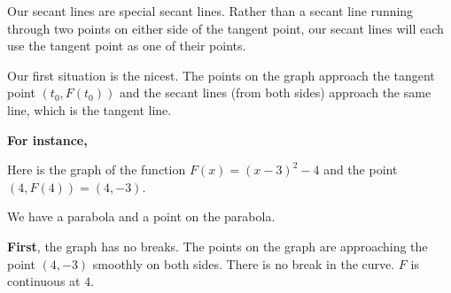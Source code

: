 \documentclass{ximera}
\begin{document}
Our secant lines are special secant lines. Rather than a secant line running through two points on either side of the tangent point, our secant lines will each use the tangent point as one of their points. 



Our first situation is the nicest. The points on the graph approach the tangent point $(t_0 , F(t_0))$ and the secant lines (from both sides) approach the same line, which is the tangent line.



\textbf{For instance,}




Here is the graph of the function $F(x) = (x - 3)^2 - 4$ and the point $(4, F(4))= (4, -3)$. 

\begin{image}
\end{image}

 



We have a parabola and a point on the parabola. 

\textbf{First}, the graph has no breaks. The points on the graph are approaching the point $(4, -3)$ smoothly on both sides.  There is no break in the curve. $F$ is continuous at $4$.
\end{document}
